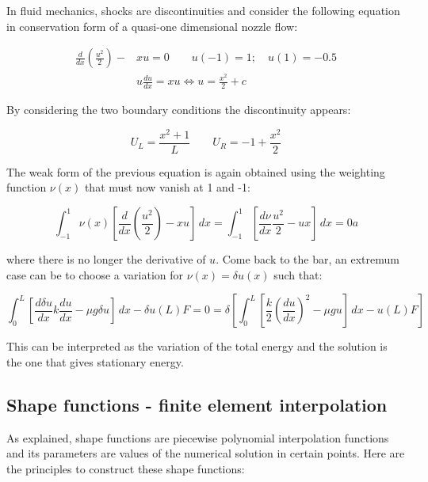 In fluid mechanics, shocks are discontinuities and consider the following equation in conservation form of a quasi-one dimensional nozzle flow: 

\begin{equation}
\begin{aligned}
\frac{d}{dx} \left( \frac{u^2}{2} \right) - &xu = 0 \qquad u(-1) = 1; \quad u(1) = -0.5\\
&u\frac{du}{dx} = xu  \Leftrightarrow u = \frac{x^2}{2}  + c 
\end{aligned}
\end{equation}

By considering the two boundary conditions the discontinuity appears: 

\begin{equation}
U_L = \frac{x^2 + 1}{L} \qquad U_R = -1 + \frac{x^2}{2}
\end{equation}

The weak form of the previous equation is again obtained using the weighting function $\nu (x)$ that must now vanish at 1 and -1: 

\begin{equation}
\int _{-1}^1 \nu (x)\left[ \frac{d}{dx}\left( \frac{u^2}{2} \right) - xu \right]\, dx = \int _{-1}^{1}\left[\frac{d\nu }{dx} \frac{u^2}{2} - ux \right]\, dx= 0a
\end{equation}

where there is no longer the derivative of $u$. Come back to the bar, an extremum case can be to choose a variation for $\nu(x) = \delta u(x)$ such that: 

\begin{equation}
\int _0 ^L \left[\frac{d\delta u}{dx} k \frac{du}{dx} - \mu g \delta u \right]\, dx  -\delta u (L) F = 0 = \delta \left[ \int _0 ^L \left[\frac{k}{2} \left(\frac{du}{dx}\right) ^2 - \mu g u \right]\, dx  -u(L) F \right]
\end{equation}

This can be interpreted as the variation of the total energy and the solution is the one that gives stationary energy.

\subsection{Shape functions - finite element interpolation}

As explained, shape functions are piecewise polynomial interpolation functions and its parameters are values of the numerical solution in certain points. Here are the principles to construct these shape functions: \\

